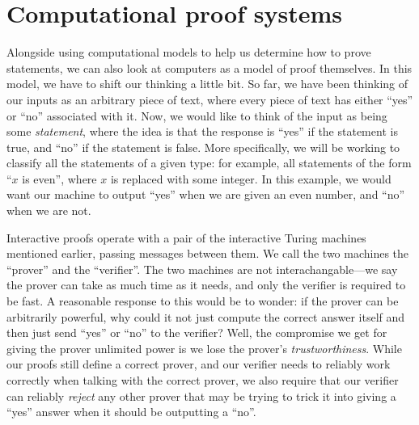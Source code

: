 \documentclass[english,12pt]{reedthesis}
\theoremstyle{plain}
\theoremstyle{definition}
\theoremstyle{remark}
\begin{document}
\section{Computational proof systems}

Alongside using computational models to help us determine how to prove
statements, we can also look at computers as a model of proof themselves. In
this model, we have to shift our thinking a little bit. So far, we have been
thinking of our inputs as an arbitrary piece of text, where every piece of text
has either ``yes'' or ``no'' associated with it. Now, we would like to think of
the input as being some \emph{statement}, where the idea is that the response is
``yes'' if the statement is true, and ``no'' if the statement is false. More
specifically, we will be working to classify all the statements of a given type:
for example, all statements of the form ``$x$ is even'', where $x$ is replaced
with some integer. In this example, we would want our machine to output ``yes''
when we are given an even number, and ``no'' when we are not.

Interactive proofs operate with a pair of the interactive Turing machines
mentioned earlier, passing messages between them. We call the two machines the
``prover'' and the ``verifier''. The two machines are not interachangable---we say
the prover can take as much time as it needs, and only the verifier is required
to be fast. A reasonable response to this would be to wonder: if the prover can
be arbitrarily powerful, why could it not just compute the correct answer itself
and then just send ``yes'' or ``no'' to the verifier? Well, the compromise we
get for giving the prover unlimited power is we lose the prover's
\emph{trustworthiness}. While our proofs still define a correct prover, and our
verifier needs to reliably work correctly when talking with the correct prover,
we also require that our verifier can reliably \emph{reject} any other prover
that may be trying to trick it into giving a ``yes'' answer when it should be
outputting a ``no''.
\end{document}
